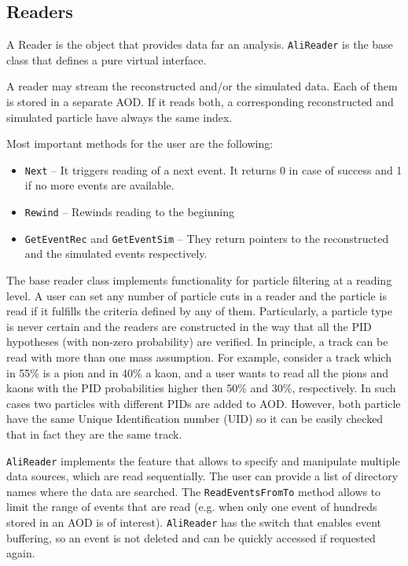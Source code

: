 \documentclass[12pt,a4paper,twoside]{article}
\begin{document}
{%

\subsection{Readers}
\label{cap:soft:secReaders}

A Reader is the object that provides data far an analysis.
\texttt{AliReader} is the base class that defines a pure virtual
interface. 

A reader may stream the reconstructed and/or the 
simulated data. Each of them is stored in a separate AOD.
If it reads both, a corresponding reconstructed and 
simulated particle have always the same index. 

Most important methods for the user are the following:
\begin{itemize}
\item   \texttt{Next} -- It triggers reading of a next event. It returns 
  0 in case of success and 1 if no more events 
  are available.
\item   \texttt{Rewind} --  Rewinds reading to the beginning
\item   \texttt{GetEventRec} and \texttt{GetEventSim} --  They return 
  pointers to the reconstructed and the simulated events respectively.
\end{itemize}

The base reader class implements functionality for
particle filtering at a reading level. A user can set any
number of particle cuts in a reader and the particle is
read if it fulfills the criteria defined by any of them.
Particularly, a particle type is never certain and the readers
are constructed in the way that all the PID hypotheses (with non-zero 
probability) are verified.
In principle, a track can be read with more than one mass 
assumption.
For example, consider a track
which in 55\% is a pion and in 40\% a kaon, and a user wants to read 
all the pions and kaons with the PID probabilities higher then 
50\% and 30\%, respectively. In such cases two particles 
with different PIDs are added to AOD. 
However, both particle have the same Unique Identification 
number (UID) so it can be easily checked that in fact they are 
the same track.

\texttt{AliReader} implements the feature that allows to specify and manipulate 
multiple data sources, which are read sequentially. 
The user can provide a list of directory names where the data are searched. 
The \texttt{ReadEventsFromTo} method allows to limit the range of events that are read
(e.g. when only one event of hundreds stored in an AOD is of interest).
\texttt{AliReader} has the switch that enables event buffering, 
so an event is not deleted and can be quickly accessed if requested again.

}
\end{document}
